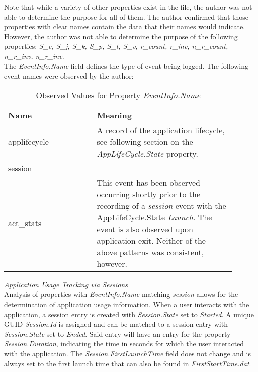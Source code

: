 \documentclass[journal]{IEEEtran}
\begin{document}
Note that while a variety of other properties exist in the file, the author was not able to determine the purpose for all of them. The author confirmed that those properties with clear names contain the data that their names would indicate. However, the author was not able to determine the purpose of the following properties: \textit{S\_e, S\_j, S\_k, S\_p, S\_t, S\_v, r\_count, r\_inv, n\_r\_count, n\_r\_inv, n\_r\_inv}.\\

The \textit{EventInfo.Name} field defines the type of event being logged. The following event names were observed by the author:

\begin{table}[h!]
\caption{Observed Values for Property \textit{EventInfo.Name}}
\begin{tabular}{p{0.35\linewidth} | p{0.55\linewidth}}
\textbf{Name} & \textbf{Meaning}                                                                                            \\ \hline
applifecycle  & A record of the application lifecycle, see following section on the \textit{AppLifeCycle.State} property.          \\
session       &                                                                                                             \\
act\_stats    & This event has been observed occurring shortly prior to the recording of a \textit{session} event with the AppLifeCycle.State \textit{Launch}. The event is also observed upon application exit. Neither of the above patterns was consistent, however.
\end{tabular}
\end{table}

\noindent\textit{Application Usage Tracking via Sessions}\\

Analysis of properties with \textit{EventInfo.Name} matching \textit{session} allows for the determination of application usage information. When a user interacts with the application, a session entry is created with \textit{Session.State} set to \textit{Started}. A unique GUID \textit{Session.Id} is assigned and can be matched to a session entry with \textit{Session.State} set to \textit{Ended}. Said entry will have an entry for the property \textit{Session.Duration}, indicating the time in seconds for which the user interacted with the application. The \textit{Session.FirstLaunchTime} field does not change and is always set to the first launch time that can also be found in \textit{FirstStartTime.dat}.\\
\end{document}
